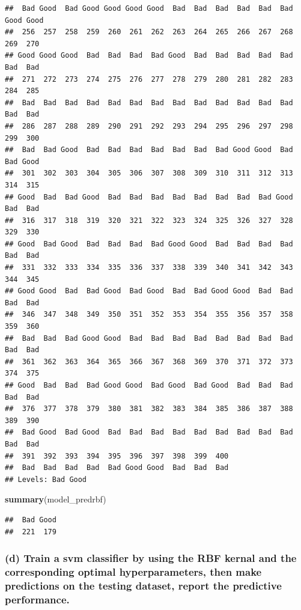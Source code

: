 \documentclass[]{article}
\newenvironment{Shaded}{\begin{snugshade}}{\end{snugshade}}
\newcommand{\KeywordTok}[1]{\textcolor[rgb]{0.13,0.29,0.53}{\textbf{#1}}}
\newcommand{\NormalTok}[1]{#1}
\begin{document}
\begin{verbatim}
##  Bad Good  Bad Good Good Good Good  Bad  Bad  Bad  Bad  Bad  Bad Good Good 
##  256  257  258  259  260  261  262  263  264  265  266  267  268  269  270 
## Good Good Good  Bad  Bad  Bad  Bad Good  Bad  Bad  Bad  Bad  Bad  Bad  Bad 
##  271  272  273  274  275  276  277  278  279  280  281  282  283  284  285 
##  Bad  Bad  Bad  Bad  Bad  Bad  Bad  Bad  Bad  Bad  Bad  Bad  Bad  Bad  Bad 
##  286  287  288  289  290  291  292  293  294  295  296  297  298  299  300 
##  Bad  Bad Good  Bad  Bad  Bad  Bad  Bad  Bad  Bad Good Good  Bad  Bad Good 
##  301  302  303  304  305  306  307  308  309  310  311  312  313  314  315 
## Good  Bad  Bad Good  Bad  Bad  Bad  Bad  Bad  Bad  Bad  Bad Good  Bad  Bad 
##  316  317  318  319  320  321  322  323  324  325  326  327  328  329  330 
## Good  Bad Good  Bad  Bad  Bad  Bad Good Good  Bad  Bad  Bad  Bad  Bad  Bad 
##  331  332  333  334  335  336  337  338  339  340  341  342  343  344  345 
## Good Good  Bad  Bad Good  Bad Good  Bad  Bad Good Good  Bad  Bad  Bad  Bad 
##  346  347  348  349  350  351  352  353  354  355  356  357  358  359  360 
##  Bad  Bad  Bad Good Good  Bad  Bad  Bad  Bad  Bad  Bad  Bad  Bad  Bad  Bad 
##  361  362  363  364  365  366  367  368  369  370  371  372  373  374  375 
## Good  Bad  Bad  Bad Good Good  Bad Good  Bad Good  Bad  Bad  Bad  Bad  Bad 
##  376  377  378  379  380  381  382  383  384  385  386  387  388  389  390 
##  Bad Good  Bad Good  Bad  Bad  Bad  Bad  Bad  Bad  Bad  Bad  Bad  Bad  Bad 
##  391  392  393  394  395  396  397  398  399  400 
##  Bad  Bad  Bad  Bad  Bad Good Good  Bad  Bad  Bad 
## Levels: Bad Good
\end{verbatim}

\begin{Shaded}
\begin{Highlighting}[]
\KeywordTok{summary}\NormalTok{(model_predrbf)}
\end{Highlighting}
\end{Shaded}

\begin{verbatim}
##  Bad Good 
##  221  179
\end{verbatim}

\hypertarget{d-train-a-svm-classifier-by-using-the-rbf-kernal-and-the-corresponding-optimal-hyperparameters-then-make-predictions-on-the-testing-dataset-report-the-predictive-performance.}{%
\subsubsection{(d) Train a svm classifier by using the RBF kernal and
the corresponding optimal hyperparameters, then make predictions on the
testing dataset, report the predictive
performance.}\label{d-train-a-svm-classifier-by-using-the-rbf-kernal-and-the-corresponding-optimal-hyperparameters-then-make-predictions-on-the-testing-dataset-report-the-predictive-performance.}}
\end{document}

